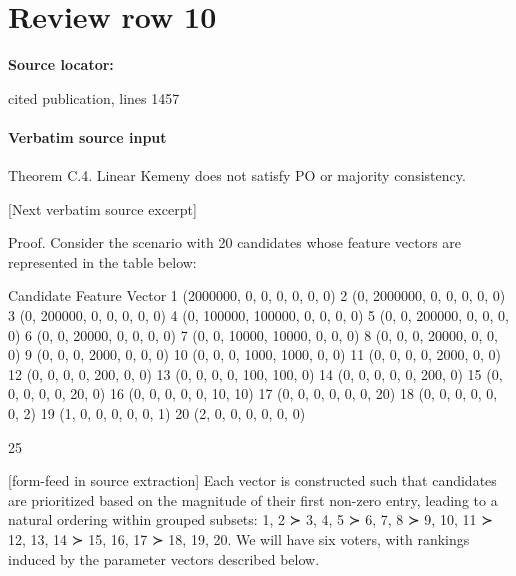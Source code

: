 \documentclass[10pt]{article}
\begin{document}
\section*{Review row 10}
\textbf{Source locator:} {\footnotesize\raggedright cited publication, lines 1457\par}
\paragraph{Verbatim source input}
\begin{ReviewVerbatim}
Theorem C.4. Linear Kemeny does not satisfy PO or majority consistency.

[Next verbatim source excerpt]

Proof. Consider the scenario with 20 candidates whose feature vectors are represented in the table
below:

                             Candidate        Feature Vector
                                  1           (2000000, 0, 0, 0, 0, 0, 0)
                                  2           (0, 2000000, 0, 0, 0, 0, 0)
                                  3           (0, 200000, 0, 0, 0, 0, 0)
                                  4           (0, 100000, 100000, 0, 0, 0, 0)
                                  5           (0, 0, 200000, 0, 0, 0, 0)
                                  6           (0, 0, 20000, 0, 0, 0, 0)
                                  7           (0, 0, 10000, 10000, 0, 0, 0)
                                  8           (0, 0, 0, 20000, 0, 0, 0)
                                  9           (0, 0, 0, 2000, 0, 0, 0)
                                 10           (0, 0, 0, 1000, 1000, 0, 0)
                                 11           (0, 0, 0, 0, 2000, 0, 0)
                                 12           (0, 0, 0, 0, 200, 0, 0)
                                 13           (0, 0, 0, 0, 100, 100, 0)
                                 14           (0, 0, 0, 0, 0, 200, 0)
                                 15           (0, 0, 0, 0, 0, 20, 0)
                                 16           (0, 0, 0, 0, 0, 10, 10)
                                 17           (0, 0, 0, 0, 0, 0, 20)
                                 18           (0, 0, 0, 0, 0, 0, 2)
                                 19           (1, 0, 0, 0, 0, 0, 1)
                                 20           (2, 0, 0, 0, 0, 0, 0)


                                                     25

[form-feed in source extraction]
Each vector is constructed such that candidates are prioritized based on the magnitude of their
first non-zero entry, leading to a natural ordering within grouped subsets: {1, 2} ≻ {3, 4, 5} ≻
{6, 7, 8} ≻ {9, 10, 11} ≻ {12, 13, 14} ≻ {15, 16, 17} ≻ {18, 19, 20}. We will have six voters,
with rankings induced by the parameter vectors described below.


\end{ReviewVerbatim}
\end{document}
